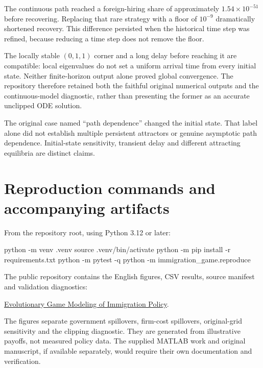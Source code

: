 \documentclass[
  11pt,
  letterpaper,
]{article}
\newenvironment{Shaded}{}{}
\newcommand{\AttributeTok}[1]{\textcolor[rgb]{0.49,0.56,0.16}{#1}}
\newcommand{\BuiltInTok}[1]{\textcolor[rgb]{0.00,0.50,0.00}{#1}}
\newcommand{\ExtensionTok}[1]{#1}
\newcommand{\NormalTok}[1]{#1}
\begin{document}
The continuous path reached a foreign-hiring share of approximately
\(1.54\times10^{-51}\) before recovering. Replacing that rare strategy
with a floor of \(10^{-9}\) dramatically shortened recovery. This
difference persisted when the historical time step was refined, because
reducing a time step does not remove the floor.

The locally stable \((0,1,1)\) corner and a long delay before reaching
it are compatible: local eigenvalues do not set a uniform arrival time
from every initial state. Neither finite-horizon output alone proved
global convergence. The repository therefore retained both the faithful
original numerical outputs and the continuous-model diagnostic, rather
than presenting the former as an accurate unclipped ODE solution.

The original case named ``path dependence'' changed the initial state.
That label alone did not establish multiple persistent attractors or
genuine asymptotic path dependence. Initial-state sensitivity, transient
delay and different attracting equilibria are distinct claims.

\section{Reproduction commands and accompanying
artifacts}\label{reproduction-commands-and-accompanying-artifacts}

From the repository root, using Python 3.12 or later:

\begin{Shaded}
\begin{Highlighting}[]
\ExtensionTok{python} \AttributeTok{{-}m}\NormalTok{ venv .venv}
\BuiltInTok{source}\NormalTok{ .venv/bin/activate}
\ExtensionTok{python} \AttributeTok{{-}m}\NormalTok{ pip install }\AttributeTok{{-}r}\NormalTok{ requirements.txt}
\ExtensionTok{python} \AttributeTok{{-}m}\NormalTok{ pytest }\AttributeTok{{-}q}
\ExtensionTok{python} \AttributeTok{{-}m}\NormalTok{ immigration\_game.reproduce}
\end{Highlighting}
\end{Shaded}

The public repository contains the English figures, CSV results, source
manifest and validation diagnostics:

\href{https://github.com/Kai1024-star/evolutionary-game-immigration-policy}{Evolutionary
Game Modeling of Immigration Policy}.

The figures separate government spillovers, firm-cost spillovers,
original-grid sensitivity and the clipping diagnostic. They are
generated from illustrative payoffs, not measured policy data. The
supplied MATLAB work and original manuscript, if available separately,
would require their own documentation and verification.
\end{document}
